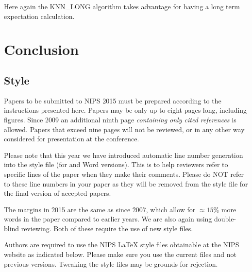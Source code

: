 \documentclass{article} %
\begin{document}
Here again the KNN\_LONG algorithm takes advantage for having a long term expectation calculation.

\clearpage
\section{Conclusion}


























\subsection{Style}

Papers to be submitted to NIPS 2015 must be prepared according to the
instructions presented here. Papers may be only up to eight pages long,
including figures. Since 2009 an additional ninth page \textit{containing only
cited references} is allowed. Papers that exceed nine pages will not be
reviewed, or in any other way considered for presentation at the conference.

Please note that this year we have introduced automatic line number generation
into the style file (for \LaTeXe and Word versions). This is to help reviewers
refer to specific lines of the paper when they make their comments. Please do
NOT refer to these line numbers in your paper as they will be removed from the
style file for the final version of accepted papers.

The margins in 2015 are the same as since 2007, which allow for $\approx 15\%$
more words in the paper compared to earlier years. We are also again using
double-blind reviewing. Both of these require the use of new style files.

Authors are required to use the NIPS \LaTeX{} style files obtainable at the
NIPS website as indicated below. Please make sure you use the current files and
not previous versions. Tweaking the style files may be grounds for rejection.

\end{document}
